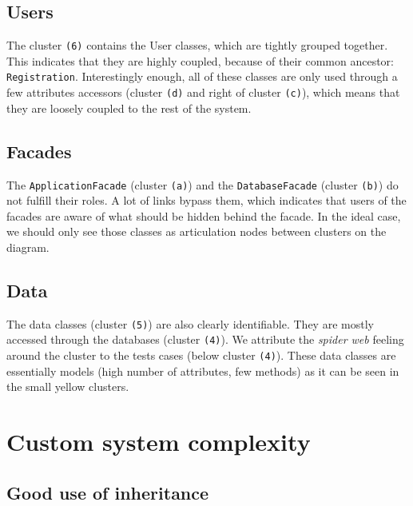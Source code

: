\subsection{Users}
The cluster \texttt{(6)} contains the User classes, which are tightly grouped together. This indicates that they are highly coupled, because of their common ancestor: \texttt{Registration}. Interestingly enough, all of these classes are only used through a few attributes accessors (cluster \texttt{(d)} and right of cluster \texttt{(c)}), which means that they are loosely coupled to the rest of the system.

\subsection{Facades}
The \texttt{ApplicationFacade} (cluster \texttt{(a)}) and the \texttt{DatabaseFacade} (cluster \texttt{(b)}) do not fulfill their roles. A lot of links bypass them, which indicates that users of the facades are aware of what should be hidden behind the facade. In the ideal case, we should only see those classes as articulation nodes between clusters on the diagram.

\subsection{Data}
The data classes (cluster \texttt{(5)}) are also clearly identifiable. They are mostly accessed through the databases (cluster \texttt{(4)}). We attribute the \textit{spider web} feeling around the cluster to the tests cases (below cluster \texttt{(4)}). These data classes are essentially models (high number of attributes, few methods) as it can be seen in the small yellow clusters.

\section{Custom system complexity}

\subsection{Good use of inheritance}


